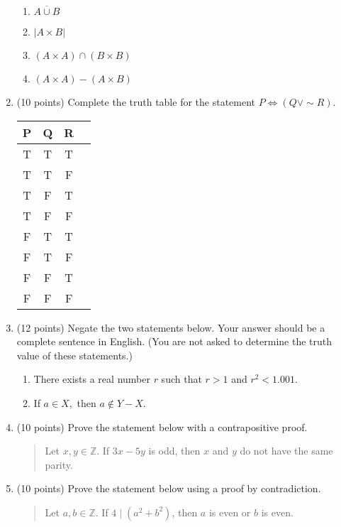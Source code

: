 \documentclass[11pt]{article}
\begin{document}
\begin{enumerate}
\begin{enumerate}
	\item $\overline{A \cup B}$\\ 
	\vspace{.3in}
	
	\item $ | A \times B |$\\ 
	\vspace{.3in}
	
	\item $ (A \times A) \cap (B \times B)$\\
	\vspace{.3in}
	
	\item $ (A \times A) - (A \times B)$\\
	\vspace{.3in}
	\end{enumerate}


\item (10 points) Complete the truth table for the statement  $P \Leftrightarrow (Q \vee \sim R).$\\

\begin{center}
\begin{tabular}{c|c|c|p{}}
P&Q&R&\\
\hline \hline
T&T&T&\\ \hline
T&T&F&\\ \hline
T&F&T&\\ \hline
T&F&F&\\ \hline
F&T&T&\\ \hline
F&T&F&\\ \hline
F&F&T&\\ \hline
F&F&F&\\ 
\end{tabular}
\end{center}
\newpage
\item (12 points) Negate the two statements below. Your answer should be a complete sentence in English. (You are not asked to determine the truth value of these statements.)
	\begin{enumerate}
	\item There exists a real number $r$ such that $r>1$ and $r^2 < 1.001.$
	\vfill
	\item If $a \in X,$ then $a \not \in Y-X.$
	\vfill
	\end{enumerate}
\item (10 points) Prove the statement below with a contrapositive proof.


\begin{quote} Let $x,y \in \mathbb{Z}.$ If $3x -5y$ is odd, then $x$ and $y$ do not have the same parity. \end{quote}
\vfill
\vspace{5in}
\newpage
\item (10 points) Prove the statement below using a proof by contradiction.

\begin{quote} Let $a,b \in \mathbb{Z}.$ If $4 \mid (a^2+b^2)$, then $a$ is even or $b$ is even. \end{quote}
\vfill
\end{enumerate}
\end{document}
